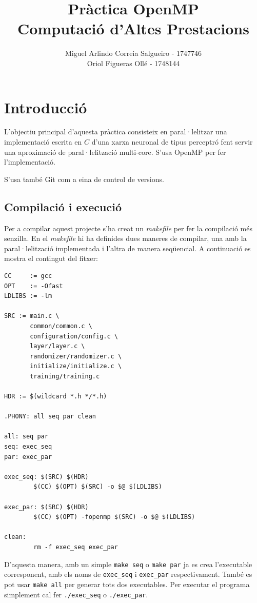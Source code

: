 \documentclass{article}
\title{Pràctica OpenMP \\ Computació d'Altes Prestacions}
\author{Miguel Arlindo Correia Salgueiro - 1747746 \\Oriol Figueras Ollé - 1748144}
\date{}
\begin{document}
\maketitle

\newpage
\tableofcontents
\newpage

\section{Introducció}

L'objectiu principal d'aquesta pràctica consisteix en paral·lelitzar una implementació escrita en $C$ d'una xarxa neuronal de tipus perceptró fent servir una aproximació de paral·lelització multi-core. S'usa OpenMP per fer l'implementació.

S'usa també Git com a eina de control de versions.

\subsection{Compilació i execució}

Per a compilar aquest projecte s'ha creat un \textit{makefile} per fer la compilació més senzilla.
En el \textit{makefile} hi ha definides dues maneres de compilar, una amb la paral·lelització implementada i l'altra de manera seqüencial.
A continuació es mostra el contingut del fitxer:
\begin{verbatim}
CC     := gcc
OPT    := -Ofast
LDLIBS := -lm

SRC := main.c \
       common/common.c \
       configuration/config.c \
       layer/layer.c \
       randomizer/randomizer.c \
       initialize/initialize.c \
       training/training.c

HDR := $(wildcard *.h */*.h)

.PHONY: all seq par clean

all: seq par
seq: exec_seq
par: exec_par

exec_seq: $(SRC) $(HDR)
        $(CC) $(OPT) $(SRC) -o $@ $(LDLIBS)

exec_par: $(SRC) $(HDR)
        $(CC) $(OPT) -fopenmp $(SRC) -o $@ $(LDLIBS)

clean:
        rm -f exec_seq exec_par

\end{verbatim}

D'aquesta manera, amb un simple \texttt{make seq} o \texttt{make par} ja es crea l'executable corresponent, amb els noms de \texttt{exec\_seq} i \texttt{exec\_par} respectivament. També es pot usar \texttt{make all} per generar tots dos executables. Per executar el programa simplement cal fer \texttt{./exec\_seq} o \texttt{./exec\_par}. 
\end{document}
